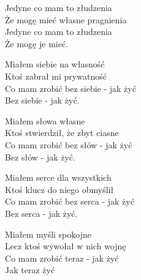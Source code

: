 \begin{text}
    Jedyne co mam to złudzenia\\
    Że mogę mieć własne pragnienia\\
    Jedyne co mam to złudzenia\\
    Że mogę je mieć.

    Miałem siebie na własność\\
    Ktoś zabrał mi prywatność\\
    Co mam zrobić bez siebie - jak żyć\\
    Bez siebie - jak żyć.

    Miałem słowa własne\\
    Ktoś stwierdził, że zbyt ciasne\\
    Co mam zrobić bez słów - jak żyć\\
    Bez słów - jak żyć.

    Miałem serce dla wszystkich\\
    Ktoś klucz do niego obmyślił\\
    Co mam zrobić bez serca - jak żyć\\
    Bez serca - jak żyć.

    Miałem myśli spokojne\\
    Lecz ktoś wywołał w nich wojnę\\
    Co mam zrobić teraz - jak żyć\\
    Jak teraz żyć
\end{text}
\begin{chord}

\end{chord}